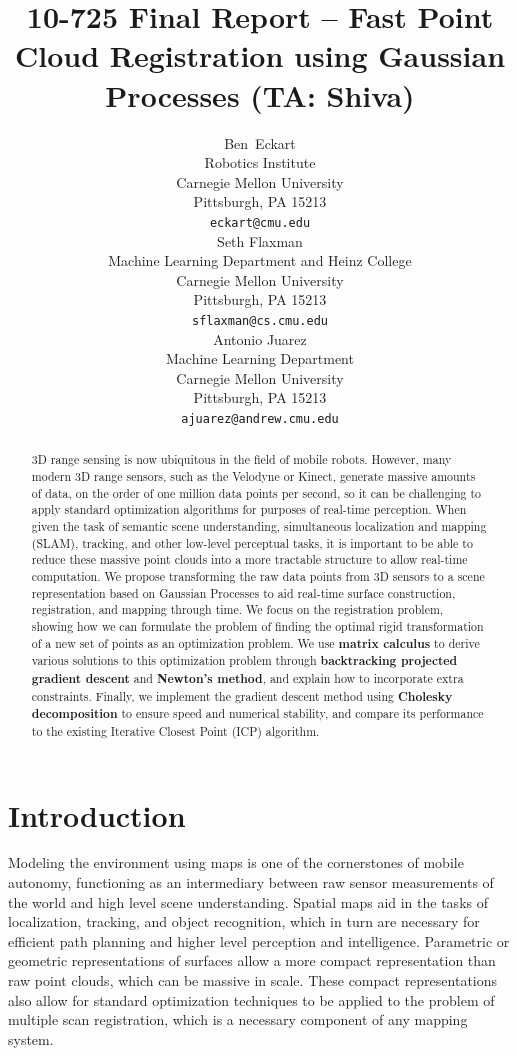 \documentclass{article} %
\title{10-725 Final Report -- Fast Point Cloud Registration using Gaussian Processes (TA: Shiva)}
\author{
Ben~Eckart\\
Robotics Institute\\
Carnegie Mellon University\\
Pittsburgh, PA 15213 \\
\texttt{eckart@cmu.edu} \\
\And
Seth Flaxman \\
Machine Learning Department and Heinz College\\
Carnegie Mellon University\\
Pittsburgh, PA 15213 \\
\texttt{sflaxman@cs.cmu.edu} \\
\And
Antonio Juarez \\
Machine Learning Department\\
Carnegie Mellon University\\
Pittsburgh, PA 15213 \\
\texttt{ajuarez@andrew.cmu.edu} \\
}
\begin{document}
\maketitle

\begin{abstract}

3D range sensing is now ubiquitous in the field of mobile robots. However, many modern 3D range sensors, such as the Velodyne or Kinect, generate massive amounts of data, on the order of one million data points per second,  so it can be challenging to apply standard optimization algorithms for purposes of real-time perception. When given the task of semantic scene understanding, simultaneous localization and mapping (SLAM), tracking, and other low-level perceptual tasks, it is important to be able to reduce these massive point clouds into a more tractable structure to allow real-time computation. We propose transforming the raw data points from 3D sensors to a scene representation based on Gaussian Processes to aid real-time surface construction, registration, and mapping through time. We focus on the registration problem, showing how we can formulate the problem of finding the optimal rigid transformation of a new set of points as an optimization problem. We use {\bf matrix calculus} to derive various solutions to this optimization problem through {\bf backtracking projected gradient descent} and {\bf Newton's method}, and explain how to incorporate extra constraints. Finally, we implement the gradient descent method using {\bf Cholesky decomposition} to ensure speed and numerical stability, and compare its performance to the existing Iterative Closest Point (ICP) algorithm.

\end{abstract}

\section{Introduction}

Modeling the environment using maps is one of the cornerstones of mobile autonomy, functioning as an intermediary between raw sensor measurements of the world and high level scene understanding. Spatial maps aid in the tasks of localization, tracking, and object recognition, which in turn are necessary for efficient path planning and higher level perception and intelligence. Parametric or geometric representations of surfaces allow a more compact representation than raw point clouds, which can be massive in scale. These compact representations also allow for standard optimization techniques to be applied to the problem of multiple scan registration, which is a necessary component of any mapping system.
\end{document}
